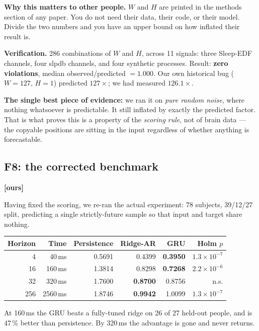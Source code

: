 \documentclass[11pt]{article}
\begin{document}
\textbf{Why this matters to other people.} $W$ and $H$ are printed in the methods
section of any paper. You do not need their data, their code, or their model.
Divide the two numbers and you have an upper bound on how inflated their result
is.

\textbf{Verification.} 286 combinations of $W$ and $H$, across 11 signals: three
Sleep-EDF channels, four slpdb channels, and four synthetic processes. Result:
\textbf{zero violations}, median observed/predicted $= 1.000$. Our own historical
bug ($W=127$, $H=1$) predicted $127\times$; we had measured $126.1\times$.

\begin{keybox}
\textbf{The single best piece of evidence:} we ran it on \emph{pure random noise},
where nothing whatsoever is predictable. It still inflated by exactly the
predicted factor. That is what proves this is a property of the \emph{scoring
rule}, not of brain data --- the copyable positions are sitting in the input
regardless of whether anything is forecastable.
\end{keybox}

\subsection{F8: the corrected benchmark} \textbf{[ours]}

Having fixed the scoring, we re-ran the actual experiment: 78 subjects, 39/12/27
split, predicting a single strictly-future sample so that input and target share
nothing.

\begin{center}\small
\begin{tabular}{rrrrrr}
\toprule
Horizon & Time & Persistence & Ridge-AR & GRU & Holm $p$ \\
\midrule
4 & 40\,ms & 0.5691 & 0.4399 & \textbf{0.3950} & $1.3\times10^{-7}$ \\
16 & 160\,ms & 1.3814 & 0.8298 & \textbf{0.7268} & $2.2\times10^{-6}$ \\
32 & 320\,ms & 1.7600 & \textbf{0.8700} & 0.8756 & n.s. \\
256 & 2560\,ms & 1.8746 & \textbf{0.9942} & 1.0099 & $1.3\times10^{-7}$ \\
\bottomrule
\end{tabular}
\end{center}

At 160\,ms the GRU beats a fully-tuned ridge on 26 of 27 held-out people, and is
47\,\% better than persistence. By 320\,ms the advantage is gone and never returns.
\end{document}
